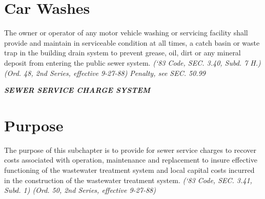 \documentclass[code.tex]{subfiles}
\begin{document}
\section{Car Washes}
The owner or operator of any motor vehicle washing or servicing facility shall provide and maintain in serviceable condition at all times, a catch basin or waste trap in the building drain system to prevent grease, oil, dirt or any mineral deposit from entering the public sewer system.\newline
\emph{(‘83 Code, SEC. 3.40, Subd. 7 H.) (Ord. 48, 2nd Series, effective 9-27-88)}\newline
\emph{Penalty, see SEC. 50.99}


\begin{center}
\emph{\textbf{\LARGE{SEWER SERVICE CHARGE SYSTEM}}}
\end{center}

\setcounter{section}{54}
\section{Purpose}
The purpose of this subchapter is to provide for sewer service charges to recover costs associated with operation, maintenance and replacement to insure effective functioning of the wastewater treatment system and local capital costs incurred in the construction of the wastewater treatment system.\newline
\emph{(‘83 Code, SEC. 3.41, Subd. 1) (Ord. 50, 2nd Series, effective 9-27-88)}
\end{document}
